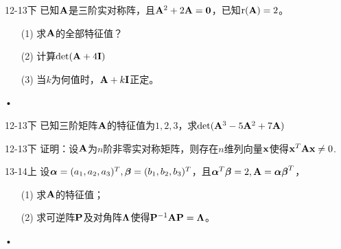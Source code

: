 \begin{frame} 
  \begin{footnotesize}

 \begin{exampleblock}{12-13下}     
     已知$\mathbf{A}$是三阶实对称阵，且$\mathbf{A}^2+2\mathbf{A}= \mathbf{0}$，已知$\mathrm{r}(\mathbf{A})=2$。
\begin{itemize}
\item[(1)] 求$\mathbf{A}$的全部特征值？ 
\item[(2)] 计算$\det(\mathbf{A}+4\mathbf{I})$
\item[(3)] 当$k$为何值时，$\mathbf{A}+k\mathbf{I}$正定。

\end{itemize}•
    \end{exampleblock}



\begin{exampleblock}{12-13下}     
     已知三阶矩阵$\mathbf{A}$的特征值为$1,2,3$，求$\det(\mathbf{A}^3-5\mathbf{A}^2+7\mathbf{A})$
    \end{exampleblock}

\begin{exampleblock}{12-13下}     
     证明：设$\mathbf{A}$为$n$阶非零实对称矩阵，则存在$n$维列向量$\mathbf{x}$使得$\mathbf{x}^T\mathbf{A}\mathbf{x}\ne 0$.
    \end{exampleblock}


 \end{footnotesize}
\end{frame}



\begin{frame} 
  \begin{footnotesize}
\begin{exampleblock}{13-14上}     
     设$\boldsymbol{\alpha}=(a_1,a_2,a_3)^T,\boldsymbol{\beta}=(b_1,b_2,b_3)^T$，且$\boldsymbol{\alpha}^T\boldsymbol{\beta}=2,\mathbf{A}=\boldsymbol{\alpha}\boldsymbol{\beta}^T$，
\begin{itemize}
\item[(1)] 求$\mathbf{A}$的特征值；
\item[(2)] 求可逆阵$\mathbf{P}$及对角阵$\mathbf{\Lambda}$使得$\mathbf{P}^{-1}\mathbf{A}\mathbf{P}=\mathbf{\Lambda}$。

\end{itemize}•
    \end{exampleblock}

  \end{footnotesize}
\end{frame}
